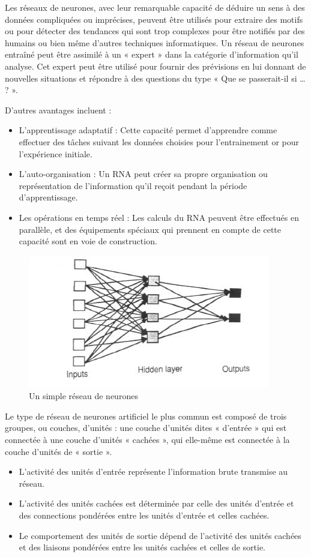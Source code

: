 \documentclass[a4paper, 12pt]{article} %
\begin{document}
Les réseaux de neurones, avec leur remarquable capacité de déduire un sens à des données compliquées ou imprécises, peuvent être utilisés pour extraire des motifs ou pour détecter des tendances qui sont trop complexes pour être notifiés par des humains ou bien même d’autres techniques informatiques. Un réseau de neurones entraîné peut être assimilé à un « expert » dans la catégorie d’information qu’il analyse. Cet expert peut être utilisé pour fournir des prévisions en lui donnant de nouvelles situations et répondre à des questions du type « Que se passerait-il si … ? ».

D’autres avantages incluent :
\begin{itemize}
	\item L’apprentissage adaptatif : Cette capacité permet d’apprendre comme effectuer des tâches  suivant les données choisies pour l’entrainement or pour l’expérience initiale.
	\item L’auto-organisation : Un RNA peut créer sa propre organisation ou représentation de l’information qu’il reçoit pendant la période d’apprentissage.
	\item Les opérations en temps réel : Les calculs du RNA peuvent être effectués en parallèle, et des équipements spéciaux qui prennent en compte de cette capacité sont en voie de construction.
\end{itemize}

\begin{figure}[!h]%
	\begin{center} 
		\includegraphics[width=0.60\columnwidth]{images/rna.jpg}%
		\caption{Un simple réseau de neurones}%
	\end{center}
\end{figure}

Le type de réseau de neurones artificiel le plus commun est composé de trois groupes, ou couches, d’unités : une couche d’unités dites « d’entrée » qui est connectée à une couche d’unités « cachées », qui elle-même est connectée à la couche d’unités de « sortie ».

\begin{itemize}
	\item L’activité des unités d’entrée représente l’information brute transmise au réseau.
	\item L’activité des unités cachées est déterminée par celle des unités d’entrée et des connections pondérées entre les unités d’entrée et celles cachées.
	\item Le comportement des unités de sortie dépend de l’activité des unités cachées et des liaisons pondérées entre les unités cachées et celles de sortie.
\end{itemize}
\end{document}

